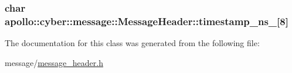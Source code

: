 \hypertarget{classapollo_1_1cyber_1_1message_1_1MessageHeader_a160761ee05fb6fa0bb24d09a0ab8ce25}{
\subsubsection[{timestamp\-\_\-ns\-\_\-}]{\setlength{\rightskip}{0pt plus 5cm}char apollo\-::cyber\-::message\-::\-Message\-Header\-::timestamp\-\_\-ns\-\_\-\mbox{[}8\mbox{]}\hspace{0.3cm}{\ttfamily [private]}}}\label{classapollo_1_1cyber_1_1message_1_1MessageHeader_a160761ee05fb6fa0bb24d09a0ab8ce25}


The documentation for this class was generated from the following file\-:\begin{DoxyCompactItemize}
\item 
message/\hyperlink{message__header_8h}{message\-\_\-header.\-h}\end{DoxyCompactItemize}
